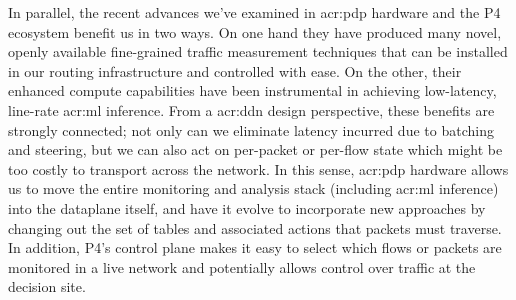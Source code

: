 
In parallel, the recent advances we've examined in \gls{acr:pdp} hardware and the P4 ecosystem benefit us in two ways.
On one hand they have produced many novel, openly available fine-grained traffic measurement techniques that can be installed in our routing infrastructure and controlled with ease.
On the other, their enhanced compute capabilities have been instrumental in achieving low-latency, line-rate \gls{acr:ml} inference.
From a \gls{acr:ddn} design perspective, these benefits are strongly connected; not only can we eliminate latency incurred due to batching and steering, but we can also act on per-packet or per-flow state which might be too costly to transport across the network.
In this sense, \gls{acr:pdp} hardware allows us to move the entire monitoring and analysis stack (including \gls{acr:ml} inference) into the dataplane itself, and have it evolve to incorporate new approaches by changing out the set of tables and associated actions that packets must traverse.
In addition, P4's control plane makes it easy to select which flows or packets are monitored in a live network and potentially allows control over traffic at the decision site.

